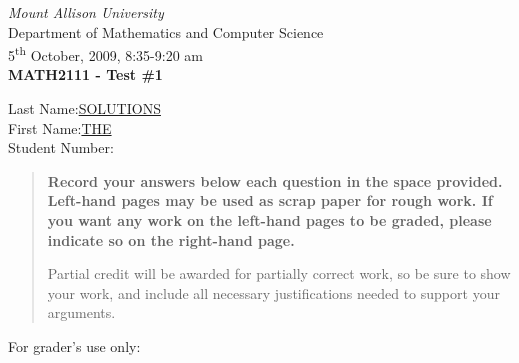 \documentclass[12pt]{article}
\newcommand{\skipline}{\vspace{12pt}}
\begin{document}
\author{Sean Fitzpatrick}
\thispagestyle{plain}
\begin{center}
\emph{Mount Allison University}\\
Department of Mathematics and Computer Science\\
5\textsuperscript{th} October, 2009, 8:35-9:20 am\\
{\bf MATH2111 - Test \#1}\\
\end{center}
\skipline \skipline \skipline \noindent \skipline
Last Name:\underline{\hspace{36pt}}\underline{SOLUTIONS}\underline{\hspace{240pt}}\\
\skipline
First Name:\underline{\hspace{36pt}}\underline{THE}\underline{\hspace{284pt}}\\
\skipline
Student Number:\underline{\hspace{321pt}}\\

\vspace{2in}


\begin{quote}
 {\bf Record your answers below each question in the space provided.    Left-hand pages may be used as scrap paper for rough work.  If you want any work on the left-hand pages to be graded, please indicate so on the right-hand page.
 
 \bigskip
 
Partial credit will be awarded for partially correct work, so be sure to show your work, and include all necessary justifications needed to support your arguments.}
\end{quote}

\vspace{2in}

For grader's use only:
\end{document}
